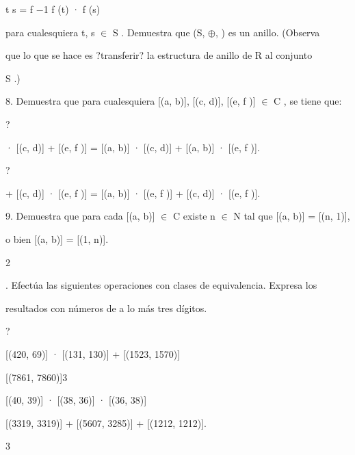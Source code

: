 \documentclass[a4paper,portrait,12pt]{article}
\begin{document}
\begin{flushleft}
t s = f $-$1 f (t) · f (s)
\end{flushleft}





\begin{flushleft}
para cualesquiera t, s $\in$ S . Demuestra que (S, $\oplus$, ) es un anillo. (Observa
\end{flushleft}


\begin{flushleft}
que lo que se hace es ?transferir? la estructura de anillo de R al conjunto
\end{flushleft}


\begin{flushleft}
S .)
\end{flushleft}


\begin{flushleft}
8. Demuestra que para cualesquiera [(a, b)], [(c, d)], [(e, f )] $\in$ C , se tiene que:
\end{flushleft}


?


\begin{flushleft}
[(a, b)] · [(c, d)] + [(e, f )] = [(a, b)] · [(c, d)] + [(a, b)] · [(e, f )].
\end{flushleft}


?


\begin{flushleft}
[(a, b)] + [(c, d)] · [(e, f )] = [(a, b)] · [(e, f )] + [(c, d)] · [(e, f )].
\end{flushleft}





\begin{flushleft}
9. Demuestra que para cada [(a, b)] $\in$ C existe n $\in$ N tal que [(a, b)] = [(n, 1)],
\end{flushleft}


\begin{flushleft}
o bien [(a, b)] = [(1, n)].
\end{flushleft}


2





\begin{flushleft}
. Efect\'{u}a las siguientes operaciones con clases de equivalencia. Expresa los
\end{flushleft}


\begin{flushleft}
resultados con n\'{u}meros de a lo m\'{a}s tres d\'{i}gitos.
\end{flushleft}


?


[(420, 69)] · [(131, 130)] + [(1523, 1570)]


[(7861, 7860)]3


[(40, 39)] · [(38, 36)] · [(36, 38)]


[(3319, 3319)] + [(5607, 3285)] + [(1212, 1212)].





3





\newpage
\end{document}
